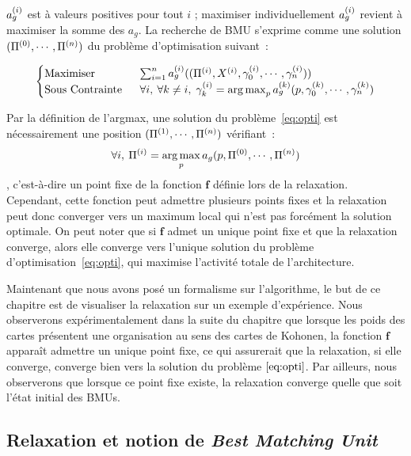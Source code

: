 \documentclass[../main]{subfiles}
\begin{document}
$a_g^{({i})}$ est à valeurs positives pour tout $i$ ; maximiser individuellement $a_g^{({i})}$ revient à maximiser la somme des $a_g$. 
La recherche de BMU s'exprime comme une solution $(\Pi^{({0})}, \cdots, \Pi^{({n})})$ du problème d'optimisation suivant~:

\begin{equation}\label{eq:opti}
	\begin{cases}
	\text{Maximiser}\;& \sum_{i = 1}^n a_g^{({i})}((\Pi^{({i})},X^{({i})},\gamma_0^{({i})}, \cdots, \gamma_n^{({i})})) \\
	\text{Sous Contrainte }\; &\forall i,\:\forall k \neq i, \; \gamma_k^{({i})} = \operatorname*{arg\,max}_{p}a_g^{({k})}(p,\gamma_0^{({k})}, \cdots, \gamma_n^{({k})})
	\end{cases}
\end{equation}

Par la définition de l'argmax, une solution du problème~\ref{eq:opti} est nécessairement une position $(\Pi^{({1})}, \cdots, \Pi^{({n})})$ vérifiant~:
$$\forall i, \: \Pi^{({i})} = \operatorname*{arg\,max}_p a_g(p, \Pi^{({0})}, \cdots, \Pi^{({n})})$$, c'est-à-dire un point fixe de la fonction $\mathbf{f}$ définie lors de la relaxation.
Cependant, cette fonction peut admettre plusieurs points fixes et la relaxation peut donc converger vers un maximum local qui n'est pas forcément la solution optimale.
On peut noter que si $\mathbf{f}$ admet un unique point fixe et que la relaxation converge, alors elle converge vers l'unique solution du problème d'optimisation~\ref{eq:opti}, qui maximise l'activité totale de l'architecture.

Maintenant que nous avons posé un formalisme sur l'algorithme, le but de ce chapitre est de visualiser la relaxation sur un exemple d'expérience.
Nous observerons expérimentalement dans la suite du chapitre que lorsque les poids des cartes présentent une organisation au sens des cartes de Kohonen, la fonction $\mathbf{f}$ apparaît admettre un unique point fixe, ce qui assurerait que la relaxation, si elle converge, converge bien vers la solution du problème $\ref{eq:opti}$. Par ailleurs, nous observerons que lorsque ce point fixe existe, la relaxation converge quelle que soit l'état initial des BMUs.

\subsection{Relaxation et notion de \emph{Best Matching Unit}}
\end{document}
